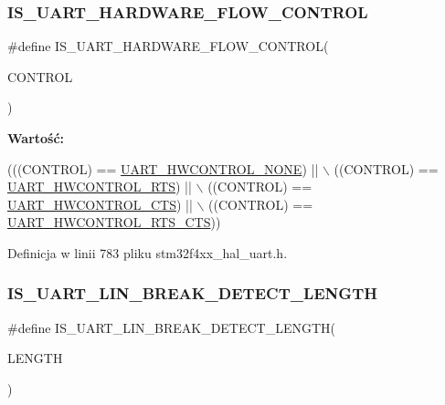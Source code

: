 \subsubsection{\texorpdfstring{I\+S\+\_\+\+U\+A\+R\+T\+\_\+\+H\+A\+R\+D\+W\+A\+R\+E\+\_\+\+F\+L\+O\+W\+\_\+\+C\+O\+N\+T\+R\+OL}{IS\_UART\_HARDWARE\_FLOW\_CONTROL}}
{\footnotesize\ttfamily \#define I\+S\+\_\+\+U\+A\+R\+T\+\_\+\+H\+A\+R\+D\+W\+A\+R\+E\+\_\+\+F\+L\+O\+W\+\_\+\+C\+O\+N\+T\+R\+OL(\begin{DoxyParamCaption}\item[{}]{C\+O\+N\+T\+R\+OL }\end{DoxyParamCaption})}

{\bfseries Wartość\+:}
\begin{DoxyCode}
(((CONTROL) == \hyperlink{group___u_a_r_t___hardware___flow___control_gae0569001c06b7760cd38c481f84116cf}{UART\_HWCONTROL\_NONE}) || \(\backslash\)
                               ((CONTROL) == \hyperlink{group___u_a_r_t___hardware___flow___control_ga6d5dad09c6abf30f252084ba0f8c0b7d}{UART\_HWCONTROL\_RTS}) || \(\backslash\)
                               ((CONTROL) == \hyperlink{group___u_a_r_t___hardware___flow___control_ga352f517245986e3b86bc75f8472c51ea}{UART\_HWCONTROL\_CTS}) || \(\backslash\)
                               ((CONTROL) == \hyperlink{group___u_a_r_t___hardware___flow___control_ga7c91698e8f08ba7ed3f2a0ba9aa27d73}{UART\_HWCONTROL\_RTS\_CTS}))
\end{DoxyCode}


Definicja w linii 783 pliku stm32f4xx\+\_\+hal\+\_\+uart.\+h.

\mbox{\label{group___u_a_r_t___private___macros_ga5f09f62c88629a872d9b6ebf1d068950}} 
\subsubsection{\texorpdfstring{I\+S\+\_\+\+U\+A\+R\+T\+\_\+\+L\+I\+N\+\_\+\+B\+R\+E\+A\+K\+\_\+\+D\+E\+T\+E\+C\+T\+\_\+\+L\+E\+N\+G\+TH}{IS\_UART\_LIN\_BREAK\_DETECT\_LENGTH}}
{\footnotesize\ttfamily \#define I\+S\+\_\+\+U\+A\+R\+T\+\_\+\+L\+I\+N\+\_\+\+B\+R\+E\+A\+K\+\_\+\+D\+E\+T\+E\+C\+T\+\_\+\+L\+E\+N\+G\+TH(\begin{DoxyParamCaption}\item[{}]{L\+E\+N\+G\+TH }\end{DoxyParamCaption})}

